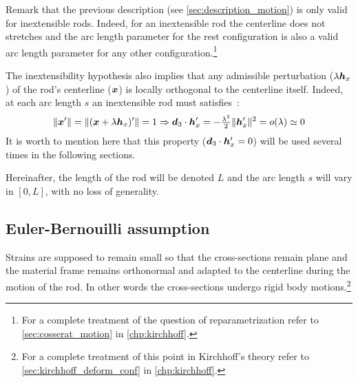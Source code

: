 Remark that the previous description (see \cref{sec:description_motion}) is only valid for inextensible rods. Indeed, for an inextensible rod the centerline does not stretches and the arc length parameter for the rest configuration is also a valid arc length parameter for any other configuration.\footnote{For a complete treatment of the question of reparametrization refer to \cref{sec:cosserat_motion} in \cref{chp:kirchhoff}.}

The inextensibility hypothesis also implies that any admissible perturbation ($\lambda\boldsymbol{h}_x$) of the rod's centerline ($\boldsymbol{x}$) is locally orthogonal to the centerline itself. Indeed, at each arc length $s$ an inextensible rod must satisfies~:
\begin{equation}
	\|\boldsymbol{x}'\| = \|(\boldsymbol{x}+\lambda\boldsymbol{h}_x)'\| = 1 \Rightarrow \boldsymbol{d}_3 \cdot \boldsymbol{h}'_x = -\tfrac{\lambda^2}{2}\|\boldsymbol{h}'_x\|^2 = o(\lambda) \simeq 0
	\label{eq:axialstrain}
\end{equation}
It is worth to mention here that this property ($\boldsymbol{d}_3 \cdot \boldsymbol{h}'_x = 0$) will be used several times in the following sections.

Hereinafter, the length of the rod will be denoted $L$ and the arc length $s$ will vary in $[0,L]$, with no loss of generality.

\subsection{Euler-Bernouilli assumption}
Strains are supposed to remain small so that the cross-sections remain plane and the material frame remains orthonormal and adapted to the centerline during the motion of the rod. In other words the cross-sections undergo rigid body motions.\footnote{For a complete treatment of this point in Kirchhoff's theory refer to \cref{sec:kirchhoff_deform_conf} in \cref{chp:kirchhoff}.}

